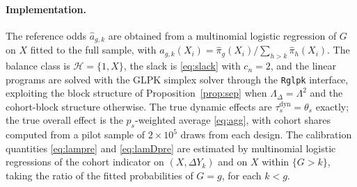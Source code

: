 \documentclass[12pt]{article}
\theoremstyle{remark}
\begin{document}
\paragraph{Implementation.} The reference odds $\widehat a_{g,k}$ are obtained from a
multinomial logistic regression of $G$ on $X$ fitted to the full sample, with
$\widehat a_{g,k}(X_i) = \widehat\pi_g(X_i)/\sum_{h > k}\widehat\pi_h(X_i)$. The balance
class is $\mathcal{H} = \{1, X\}$, the slack is \eqref{eq:slack} with $c_n = 2$, and the
linear
programs are solved with the GLPK simplex solver through the \texttt{Rglpk} interface,
exploiting the block structure of Proposition~\ref{prop:sep} when
$\Lambda_\Delta = \Lambda^2$ and the cohort-block structure otherwise. The true dynamic
effects are $\tau^{\mathrm{dyn}}_s = \theta_s$ exactly; the true overall effect is the
$p_s$-weighted average \eqref{eq:agg}, with cohort shares computed from a pilot
sample of $2 \times 10^5$ draws from each design. The calibration quantities
\eqref{eq:lampre} and \eqref{eq:lamDpre} are estimated by multinomial logistic
regressions of the cohort indicator on $(X, \Delta Y_k)$ and on $X$ within $\{G > k\}$,
taking the ratio of the fitted probabilities of $G = g$, for each $k < g$.
\end{document}
